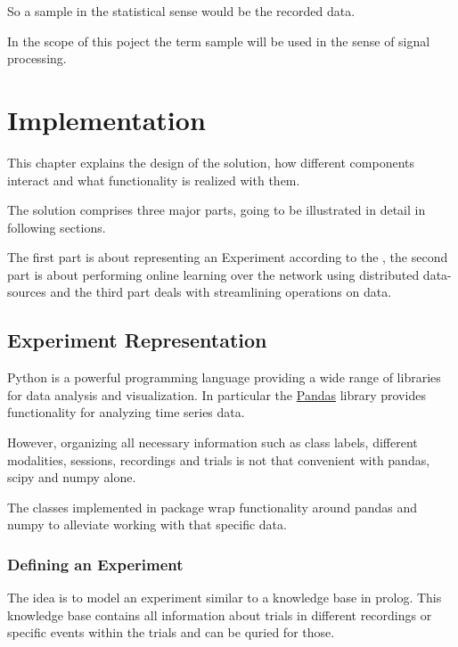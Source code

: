 \documentclass[letterpaper,10pt,english]{sphinxmanual}
\begin{document}
So a sample in the statistical sense would be the recorded data.

In the scope of this poject the term sample will be used in the sense of signal
processing.


\chapter{Implementation}
\label{implementation:implementation}\label{implementation::doc}
This chapter explains the design of the solution, how different components
interact and what functionality is realized with them.

The solution comprises three major parts, going to be illustrated in detail
in following sections.

The first part is about representing an Experiment according to the
, the second part is about performing online learning
over the network using distributed data-sources and the third part deals
with streamlining operations on data.


\section{Experiment Representation}
\label{implementation:experiment-representation}
Python is a powerful programming language providing a wide range of
libraries for data analysis and visualization. In particular the
\href{http://pandas.pydata.org/}{Pandas} library provides functionality for
analyzing time series data.

However, organizing all necessary information such as class labels, different
modalities, sessions, recordings and trials is not that convenient with pandas,
scipy and numpy alone.

The classes implemented in package  wrap functionality around
pandas and numpy to alleviate working with that specific data.


\subsection{Defining an Experiment}
\label{implementation:defining-an-experiment}
The idea is to model an experiment similar to a knowledge base in prolog.
This knowledge base contains all information about trials in different
recordings or specific events within the trials and can be quried for those.
\end{document}

